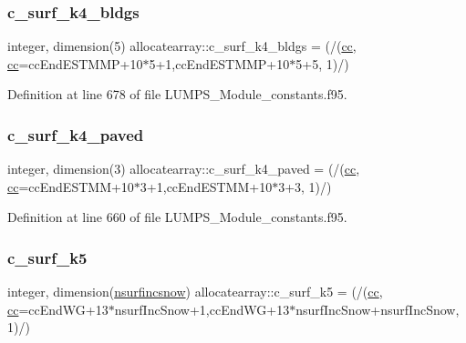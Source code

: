 \subsubsection{\texorpdfstring{c\+\_\+surf\+\_\+k4\+\_\+bldgs}{c\_surf\_k4\_bldgs}}
{\footnotesize\ttfamily integer, dimension(5) allocatearray\+::c\+\_\+surf\+\_\+k4\+\_\+bldgs = (/(\hyperlink{namespaceallocatearray_ac863c81704eb507dee10f5e10741e10c}{cc}, \hyperlink{namespaceallocatearray_ac863c81704eb507dee10f5e10741e10c}{cc}=cc\+End\+E\+S\+T\+M\+MP+10$\ast$5+1,cc\+End\+E\+S\+T\+M\+MP+10$\ast$5+5, 1)/)}



Definition at line 678 of file L\+U\+M\+P\+S\+\_\+\+Module\+\_\+constants.\+f95.

\mbox{\label{namespaceallocatearray_a43ae20538128d75655c3b8dd31374e0c}} 
\subsubsection{\texorpdfstring{c\+\_\+surf\+\_\+k4\+\_\+paved}{c\_surf\_k4\_paved}}
{\footnotesize\ttfamily integer, dimension(3) allocatearray\+::c\+\_\+surf\+\_\+k4\+\_\+paved = (/(\hyperlink{namespaceallocatearray_ac863c81704eb507dee10f5e10741e10c}{cc}, \hyperlink{namespaceallocatearray_ac863c81704eb507dee10f5e10741e10c}{cc}=cc\+End\+E\+S\+T\+MM+10$\ast$3+1,cc\+End\+E\+S\+T\+MM+10$\ast$3+3, 1)/)}



Definition at line 660 of file L\+U\+M\+P\+S\+\_\+\+Module\+\_\+constants.\+f95.

\mbox{\label{namespaceallocatearray_a690e080a92d241ea4f662cecb4f923de}} 
\subsubsection{\texorpdfstring{c\+\_\+surf\+\_\+k5}{c\_surf\_k5}}
{\footnotesize\ttfamily integer, dimension(\hyperlink{namespaceallocatearray_af4d113f332b6759cfa22271140c9162d}{nsurfincsnow}) allocatearray\+::c\+\_\+surf\+\_\+k5 = (/(\hyperlink{namespaceallocatearray_ac863c81704eb507dee10f5e10741e10c}{cc}, \hyperlink{namespaceallocatearray_ac863c81704eb507dee10f5e10741e10c}{cc}=cc\+End\+WG+13$\ast$nsurf\+Inc\+Snow+1,cc\+End\+WG+13$\ast$nsurf\+Inc\+Snow+nsurf\+Inc\+Snow, 1)/)}



